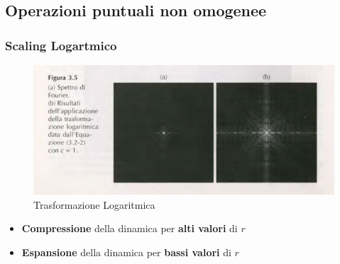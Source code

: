 \documentclass[12pt]{article}
\begin{document}
\subsection{Operazioni puntuali non omogenee}
\subsubsection{Scaling Logartmico}
\begin{figure}[!htb]
    \centering
    \includegraphics[width=1\textwidth]{Images/log.png}
    \caption{Trasformazione Logaritmica}
\end{figure}
\FloatBarrier
\begin{itemize}
    \item \textbf{Compressione} della dinamica per \textbf{alti valori} di $r$
    \item \textbf{Espansione} della dinamica per \textbf{bassi valori} di $r$
\end{itemize}
\end{document}
